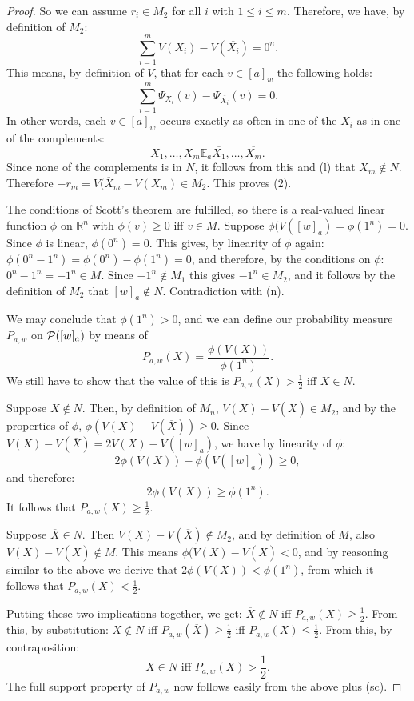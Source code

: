 \documentclass[12pt]{article}
\theoremstyle{definition}
\newcommand{\Ree}{\mathbb{R}}  %
\newcommand{\pow}{{\cal P}}    %
\begin{document}
\begin{proof}
  So we can assume $r_i \in M_2$ for all $i$ with $1 \leq i \leq m$. Therefore, we have, 
  by definition of $M_2$: 
  \[
  \sum_{i=1}^m V(X_i) - V(\overline{X_i}) = 0^n. 
  \]
  This means, by definition of $V$, that for each $v \in [a]_w$ the following holds: 
  \[
   \sum_{i=1}^m \Psi_{X_i}(v) - \Psi_{\overline{X_i}}(v) = 0. 
  \]
  In other words, each $v \in [a]_w$ occurs exactly as often in one of the $X_i$ as in one 
  of the complements: 
  \[
    X_1, \ldots, X_m \mathbb{E}_a  \overline{X_1}, \ldots, \overline{X_m}. 
  \]
  Since none of the complements is in $N$, it follows from this and (l) that $X_m \notin N$. 
  Therefore $-r_m = V(\overline{X}_m - V(X_m) \in M_2$. This proves (2). 
  
  The conditions of Scott's theorem are fulfilled, so there is a real-valued
  linear function $\phi$ on $\Ree^n$ with $\phi(v) \geq 0$ iff $v \in M$.
  Suppose $\phi(V([w]_a) = \phi(1^n) = 0$. Since $\phi$ is linear, $\phi(0^n) = 0$.
  This gives, by linearity of $\phi$ again:  $\phi(0^n - 1^n) =  \phi(0^n) - \phi(1^n) = 0$, 
  and therefore, by the conditions on $\phi$: $0^n - 1^n = -1^n \in M$. Since 
  $-1^n \notin M_1$ this gives $-1^n \in M_2$, and it follows by the definition of $M_2$ 
  that $[w]_a \notin N$. Contradiction with (n). 

  We may conclude that $\phi(1^n) > 0$, and we can define our probability measure 
  $P_{a,w}$ on $\pow ([w]_a)$ by means of 
  \[
     P_{a,w}(X) = \frac{\phi(V(X))}{\phi(1^n)}.
  \]
  We still have to show that the value of this is $ P_{a,w}(X) > \frac{1}{2}$ iff $ X \in N$. 

  Suppose $\overline{X} \notin N$. Then, by definition of $M_n$, $V(X) - V(\overline{X}) \in M_2$, 
  and by the properties of $\phi$,  $\phi(V(X) - V(\overline{X})) \geq 0$. 
  Since $V(X) - V(\overline{X}) = 2V(X) - V([w]_a)$, we have by linearity of $\phi$: 
  \[
    2 \phi(V(X)) - \phi(V([w]_a)) \geq 0, 
  \]
  and therefore: 
  \[
     2 \phi(V(X)) \geq \phi(1^n).
  \]
  It follows that $P_{a,w} (X) \geq \frac{1}{2}$. 
  
  Suppose $\overline{X} \in N$. Then $V(X) - V(\overline{X}) \notin M_2$, and by definition of $M$, 
  also $V(X) - V(\overline{X}) \notin M$. This means $\phi(V(X) - V(\overline{X}) < 0$, 
  and by reasoning similar to the above we derive that $2 \phi(V(X)) < \phi(1^n)$, 
  from which it follows that  $P_{a,w} (X) < \frac{1}{2}$. 

  Putting these two implications together, we get: $\overline{X}
  \notin N$ iff $P_{a,w} (X) \geq \frac{1}{2}$.  From this, by
  substitution: $X \notin N$ iff $P_{a,w} (\overline{X}) \geq
  \frac{1}{2}$ iff $P_{a,w} (X) \leq \frac{1}{2}$. From this, by
  contraposition:
\[
    X \in N \text{ iff } P_{a,w} (X) > \frac{1}{2}. 
\]
The full support property of $P_{a,w}$ now follows easily from the above plus (sc). 
\end{proof}
\end{document}
